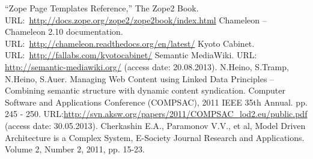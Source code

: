 \documentclass[conference]{IEEEtran}
\begin{document}
\begin{thebibliography}{11}
 ``Zope Page Templates Reference,'' The Zope2 Book. URL:~\url{http://docs.zope.org/zope2/zope2book/index.html}
 Chameleon -- Chameleon 2.10 documentation.
  URL:~\url{http://chameleon.readthedocs.org/en/latest/}
 Kyoto Cabinet. URL:~\url{http://fallabs.com/kyotocabinet/}
 Semantic MediaWiki. URL: \url{http://semantic-mediawiki.org/} (access date: 20.08.2013).
 N.Heino, S.Tramp, N.Heino, S.Auer. Managing Web Content using Linked Data Principles – Combining semantic structure with dynamic content syndication. Computer Software and Applications Conference (COMPSAC), 2011 IEEE 35th Annual. pp. 245 - 250. URL:\url{http://svn.aksw.org/papers/2011/COMPSAC_lod2.eu/public.pdf} (access date: 30.05.2013).
 Cherkashin E.A., Paramonov V.V., et al, Model Driven Architecture is a Complex System, E-Society Journal Research and Applications. Volume 2, Number 2, 2011, pp. 15-23.

\end{thebibliography}
\vspace{-2em}\mbox{} %
\end{document}
